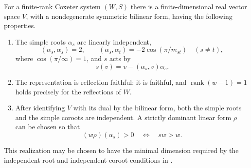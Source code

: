 \begin{lemma}
\label{bg:realization}
For a finite-rank Coxeter system $(W,S)$ there is a finite-dimensional real
vector space $V$, with a nondegenerate symmetric bilinear form, having the
following properties.
\begin{enumerate}
\item The simple roots $\alpha_s$ are linearly independent,
\[
 (\alpha_s,\alpha_s)=2,
 \qquad
 (\alpha_s,\alpha_t)=-2\cos(\pi/m_{st})\quad(s\ne t),
\]
where $\cos(\pi/\infty)=1$, and $s$ acts by
\[
 s(v)=v-(\alpha_s,v)\alpha_s.
\]
\item The representation is reflection faithful: it is faithful, and
$\operatorname{rank}(w-1)=1$ holds precisely for the reflections of $W$.
\item After identifying $V$ with its dual by the bilinear form, both the
simple roots and the simple coroots are independent.  A strictly dominant
linear form $\rho$ can be chosen so that
\[
 (w\rho)(\alpha_s)>0\quad\Longleftrightarrow\quad sw>w.
\]
\end{enumerate}
This realization may be chosen to have the minimal dimension required by
the independent-root and independent-coroot conditions in
\cite[Section~3.1]{EW14}.
\end{lemma}

